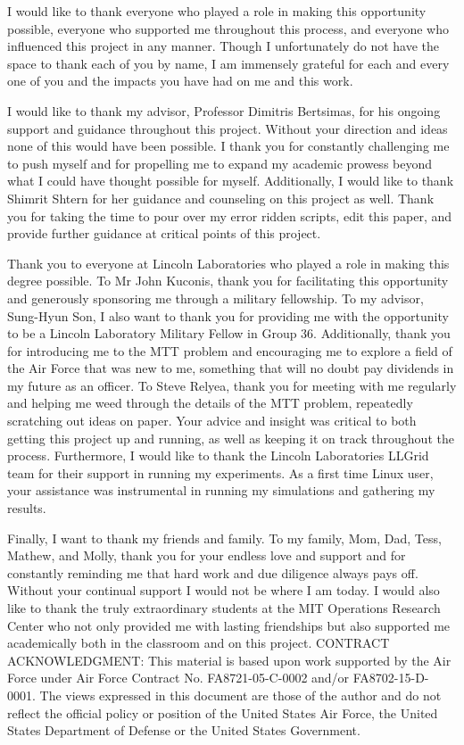 I would like to thank everyone who played a role in making this opportunity possible, everyone who supported me throughout this process, and everyone who influenced this project in any manner. Though I unfortunately do not have the space to thank each of you by name, I am immensely grateful for each and every one of you and the impacts you have had on me and this work. 

I would like to thank my advisor, Professor Dimitris Bertsimas, for his ongoing support and
guidance throughout this project. Without your direction and ideas none of this would have been possible. I thank you for constantly challenging me to push myself and for propelling me to expand my academic prowess beyond what I could have thought possible for myself. Additionally, I would like to thank Shimrit Shtern for her guidance and counseling on this project as well. Thank you for taking the time to pour over my error ridden scripts, edit this paper, and provide further guidance at critical points of this project. 

Thank you to everyone at Lincoln Laboratories who played a role in making this degree possible. To Mr John Kuconis, thank you for facilitating this opportunity and generously sponsoring me through a military fellowship. To my advisor, Sung-Hyun Son, I also want to thank you for providing me with the opportunity to be a Lincoln Laboratory Military Fellow in Group 36. Additionally, thank you for introducing me to the MTT problem and encouraging me to explore a field of the Air Force that was new to me, something that will no doubt pay dividends in my future as an officer. To Steve Relyea, thank you for meeting with me regularly and helping me weed through the details of the MTT problem, repeatedly scratching out ideas on paper. Your advice and insight was critical to both getting this project up and running, as well as keeping it on track throughout the process. Furthermore, I would like to thank the Lincoln Laboratories LLGrid team for their support in running my experiments. As a first time Linux user, your assistance was instrumental in running my simulations and gathering my results.

Finally, I want to thank my friends and family. To my family, Mom, Dad, Tess, Mathew, and Molly, thank you for your endless love and support and for constantly reminding me that hard work and due diligence always pays off. Without your continual support I would not be where I am today. I would also like to thank the truly extraordinary students at the MIT Operations Research Center who not only provided me with lasting friendships but also supported me academically both in the classroom and on this project. 
\vfill
CONTRACT ACKNOWLEDGMENT: This material is based upon work supported by the Air Force under Air Force Contract No. FA8721-05-C-0002 and/or FA8702-15-D-0001. The views expressed in this document are those of the author and do not reflect the official policy or position of the United States Air Force, the United States Department of Defense or the United States Government.